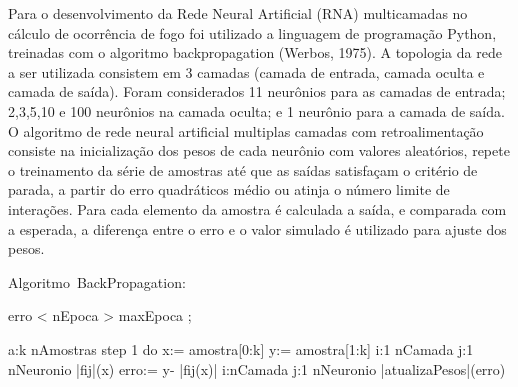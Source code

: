 \documentclass[conference]{IEEEtran}
\begin{document}
Para o desenvolvimento da Rede Neural Artificial (RNA) multicamadas no cálculo de ocorrência de fogo foi utilizado a linguagem de programação Python, treinadas com o algoritmo backpropagation (Werbos, 1975). A topologia da rede a ser utilizada consistem em 3 camadas (camada de entrada, camada oculta e camada de saída). Foram considerados  11 neurônios para as camadas de entrada; 2,3,5,10 e 100 neurônios na camada oculta; e 1 neurônio para a camada de saída.\\
O algoritmo de rede neural artificial multiplas camadas com retroalimentação consiste na inicialização dos pesos de cada neurônio com valores aleatórios, repete o treinamento da série de amostras até que as saídas satisfaçam o critério de parada, a partir do erro quadráticos médio ou atinja o número limite de interações. Para cada elemento da amostra é calculada a saída, e comparada com a esperada, a diferença entre o erro e o valor simulado é utilizado para ajuste dos pesos.\\

\begin{program}
\mbox{Algoritmo BackPropagation:}
\BEGIN \\ %

\DO \IF erro < \varepsilon \OR nEpoca > maxEpoca \THEN \EXIT \FI;

  	\FOR a:k \TO nAmostras step 1 do
		x:= amostra[0:k]
		y:= amostra[1:k]
		\FOR i:1 \TO nCamada  \DO
			\FOR j:1 \TO nNeuronio  \DO
				|fij|(x)
         			erro:=  y- |fij(x)|
			\END
		\END
		\FOR i:nCamada    \DO
			\FOR j:1 \TO nNeuronio  \DO
				|atualizaPesos|(erro)

\end{program}
\end{document}
